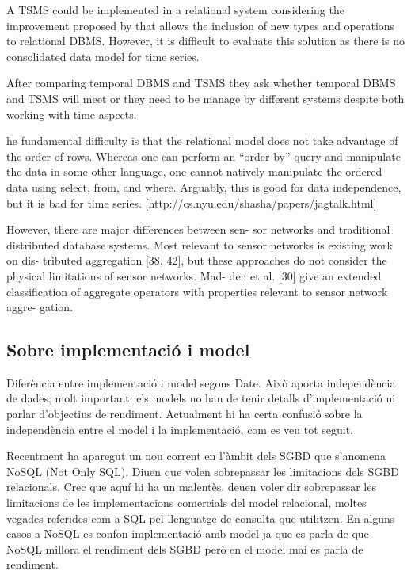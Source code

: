 A TSMS could be implemented in a relational system considering the improvement proposed by \textcite{stonebraker86} that allows the inclusion of new types and operations to relational DBMS. However, it is difficult to evaluate this solution as there is no consolidated data model  for time series. 

After comparing temporal DBMS and TSMS \parencite{schmidt95} they ask whether temporal DBMS and TSMS will meet or they need to be manage by different systems despite both working with time aspects.


he fundamental difficulty is that the relational model does not take advantage of the order of rows. Whereas one can perform an ``order by'' query and manipulate the data in some other language, one cannot natively manipulate the ordered data using select, from, and where. 
Arguably, this is good for data independence, but it is bad for time series.
[http://cs.nyu.edu/shasha/papers/jagtalk.html]

        However, there are major differences between sen-
sor networks and traditional distributed database systems.
Most relevant to sensor networks is existing work on dis-
tributed aggregation [38, 42], but these approaches do not
consider the physical limitations of sensor networks. Mad-
den et al. [30] give an extended classification of aggregate
operators with properties relevant to sensor network aggre-
gation. %


\subsection{Sobre implementació i model}

Diferència entre implementació i model segons Date. Això aporta independència de dades; molt important: els models no han de tenir detalls d'implementació ni parlar d'objectius de rendiment.
Actualment hi ha certa confusió sobre la independència entre el model i la implementació, com es veu tot seguit.


Recentment ha aparegut un nou corrent en l'àmbit dels SGBD que s'anomena NoSQL (Not Only SQL). Diuen que volen sobrepassar les limitacions dels SGBD relacionals. Crec que aquí hi ha un malentès, deuen voler dir sobrepassar les limitacions de les implementacions comercials del model relacional, moltes vegades referides com a SQL pel llenguatge de consulta que utilitzen. En alguns casos a NoSQL es confon implementació amb model ja que es parla de que NoSQL millora el rendiment dels SGBD però en el model mai es parla de rendiment. 

